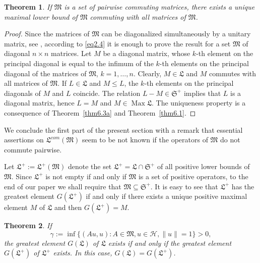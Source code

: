 \documentclass[12pt, a4paper, reqno, twoside]{amsart}
\numberwithin{equation}{section}
\DeclareMathOperator{\Max}{Max}
\newcommand{\frakS}{\mathfrak S}
\newcommand{\frakL}{\mathfrak L}
\newcommand{\frakM}{\mathfrak M}
\newtheorem{theorem}{Theorem}[section]
\theoremstyle{definition}
\theoremstyle{remark}
\theoremstyle{mystyle}
\begin{document}
\begin{theorem}
\label{thm6.7}
If $\frakM$ is a set of pairwise commuting matrices, there exists a
unique maximal lower bound of $\frakM$ commuting with all matrices of $\frakM$.  
\end{theorem}

\begin{proof}
Since the matrices of $\frakM$ can be diagonalized simultaneously by a
unitary matrix, see \cite[Thm.~2.5.5]{HornJohnson2013}, 
according to \eqref{eq2.4} it is enough to prove the
result for a set $\frakM$ of diagonal $n\times n$ matrices. Let $M$ be
a diagonal matrix, whose $k$-th element on the principal diagonal is
equal to the infimum of the $k$-th elements on the principal diagonal
of the matrices of $\frakM$, $k=1,\ldots,n$. Clearly, $M\in\frakL$ and
$M$ commutes with all matrices of $\frakM$. If $L\in\frakL$ and $M\leq
L$, the $k$-th elements on the principal diagonals of $M$ and $L$
coincide. The relation $L-M\in\frakS^{+}$ implies that $L$ is a diagonal
matrix, hence $L=M$ and $M\in\Max\frakL$. The uniqueness property is a
consequence of Theorem~\ref{thm6.3a} and Theorem~\ref{thm6.1}.
\end{proof}

We conclude the first part of the present section with a remark that
essential assertions on $\frakL^{com}(\frakM)$ seem to be not known if
the operators of $\frakM$ do not commute pairwise. 

Let $\frakL^{+}:=\frakL^{+}(\frakM)$ denote the set
$\frakL^{+}=\frakL\cap\frakS^{+}$ of all positive lower bounds of
$\frakM$. Since $\frakL^{+}$ is not empty if and only if $\frakM$ is a
set of positive operators, to the end of our paper we shall require that
$\frakM\subseteq\frakS^{+}$. It is easy to see that $\frakL^{+}$
has the greatest element $G(\frakL^{+})$ if and only if there exists a
unique positive maximal element $M$ of $\frakL$ and then $G(\frakL^{+})=M$.

\begin{theorem}
\label{thm6.7a}
If
\begin{equation}
  \label{eq6.5}
  \gamma:=\inf\bigl\{(Au,u):A\in\frakM, u\in\mathscr H,\|u\|=1\bigr\}>0,
\end{equation}
the greatest element $G(\frakL)$ of $\frakL$ exists if and only if the
greatest element $G(\frakL^{+})$ of $\frakL^{+}$ exists. In this case, $G(\frakL)=G(\frakL^{+})$.
\end{theorem}
\end{document}
